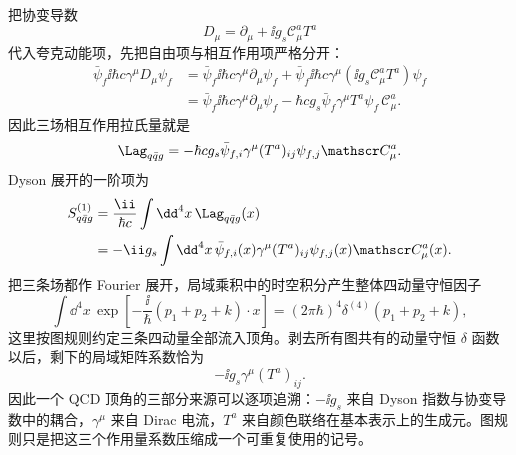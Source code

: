 \begin{derivation}[夸克与胶子的相互作用顶角]
把协变导数
\[
D_\mu=\partial_\mu+\ii g_s\mathscr C_\mu^aT^a
\]
代入夸克动能项，先把自由项与相互作用项严格分开：
\begin{align*}
\bar\psi_f\ii\hbar c\gamma^\mu D_\mu\psi_f
&=\bar\psi_f\ii\hbar c\gamma^\mu\partial_\mu\psi_f
+\bar\psi_f\ii\hbar c\gamma^\mu
(\ii g_s\mathscr C_\mu^aT^a)\psi_f\\
&=\bar\psi_f\ii\hbar c\gamma^\mu\partial_\mu\psi_f
-\hbar c g_s\bar\psi_f\gamma^\mu T^a\psi_f\,\mathscr C_\mu^a.
\end{align*}
因此三场相互作用拉氏量就是
\[
\Lag_{q\bar q g}
=-\hbar c g_s\bar\psi_{f,i}\gamma^\mu(T^a)_{ij}\psi_{f,j}\mathscr C_\mu^a.
\]
Dyson 展开的一阶项为
\begin{align*}
S_{q\bar q g}^{(1)}
&=\frac{\ii}{\hbar c}\int\dd^4x\,\Lag_{q\bar q g}(x)\\
&=-\ii g_s\int\dd^4x\,
\bar\psi_{f,i}(x)\gamma^\mu(T^a)_{ij}\psi_{f,j}(x)\mathscr C_\mu^a(x).
\end{align*}
把三条场都作 Fourier 展开，局域乘积中的时空积分产生整体四动量守恒因子
\[
\int\dd^4x\,
\exp\!\left[-\frac{\ii}{\hbar}
(p_1+p_2+k)\cdot x\right]
=(2\pi\hbar)^4\delta^{(4)}(p_1+p_2+k),
\]
这里按图规则约定三条四动量全部流入顶角。剥去所有图共有的动量守恒 $\delta$ 函数以后，剩下的局域矩阵系数恰为
\[
{-\ii g_s\gamma^\mu(T^a)_{ij}}.
\]
因此一个 QCD 顶角的三部分来源可以逐项追溯：$-\ii g_s$ 来自 Dyson 指数与协变导数中的耦合，$\gamma^\mu$ 来自 Dirac 电流，$T^a$ 来自颜色联络在基本表示上的生成元。图规则只是把这三个作用量系数压缩成一个可重复使用的记号。
\end{derivation}

